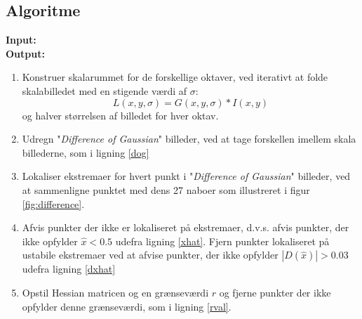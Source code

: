 \subsection*{Algoritme}
\textbf{Input:} \\
\textbf{Output:}
\begin{enumerate}
\item{Konstruer skalarummet for de forskellige oktaver, ved iterativt at folde skalabilledet med en stigende værdi af $\sigma$: $$ L(x,y,\sigma)= G(x,y,\sigma) \ast I(x,y) $$
og halver størrelsen af billedet for hver oktav.}
\item{Udregn "\textit{Difference of Gaussian}" billeder, ved at tage forskellen imellem skala billederne, som i ligning \eqref{dog}}
\item{Lokaliser ekstremaer for hvert punkt i "\textit{Difference of Gaussian}" billeder, ved at sammenligne punktet med dens 27 naboer som illustreret i figur \ref{fig:difference}.}
\item{Afvis punkter der ikke er lokaliseret på ekstremaer, d.v.s. afvis punkter, der ikke opfylder $\hat{x}<0.5$ udefra ligning \eqref{xhat}.
Fjern punkter lokaliseret på ustabile ekstremaer ved at afvise punkter, der ikke opfylder $ |D(\hat{x})|>0.03 $ udefra ligning \eqref{dxhat}}
\item{Opstil Hessian matricen og en grænseværdi $r$ og fjerne punkter der ikke opfylder denne grænseværdi, som i ligning \eqref{rval}.}
\end{enumerate}